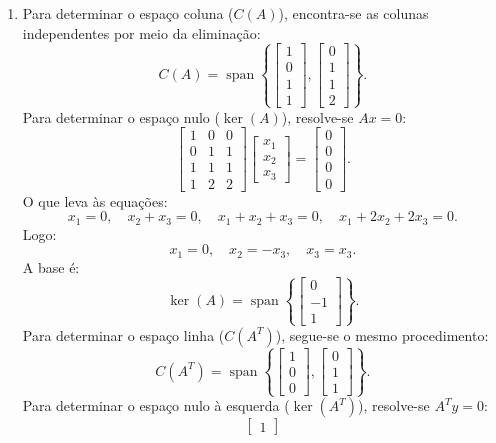 \begin{resolution}
\begin{enumerate}[label=\alph*)]
    \item Para determinar o espaço coluna (\( C(A) \)), encontra-se as colunas independentes por meio da eliminação:
          \[
            C(A) = \operatorname{span}\left\{
            \begin{bmatrix} 1 \\ 0 \\ 1 \\ 1 \end{bmatrix},
            \begin{bmatrix} 0 \\ 1 \\ 1 \\ 2 \end{bmatrix}
            \right\}.
          \]
          Para determinar o espaço nulo (\( \operatorname{ker}(A) \)), resolve-se \( A x = 0 \):
          \[
            \begin{bmatrix}
              1 & 0 & 0 \\
              0 & 1 & 1 \\
              1 & 1 & 1 \\
              1 & 2 & 2
            \end{bmatrix}
            \begin{bmatrix}
              x_1 \\ x_2 \\ x_3
            \end{bmatrix} =
            \begin{bmatrix}
              0 \\ 0 \\ 0 \\ 0
            \end{bmatrix}.
          \]
          O que leva às equações:
          \[
            x_1 = 0, \quad x_2 + x_3 = 0, \quad x_1 + x_2 + x_3 = 0, \quad x_1 + 2x_2 + 2x_3 = 0.
          \]
          Logo:
          \[
            x_1 = 0, \quad x_2 = -x_3, \quad x_3 = x_3.
          \]
          A base é:
          \[
            \operatorname{ker}(A) =  \operatorname{span}\left\{
            \begin{bmatrix} 0 \\ -1 \\ 1 \end{bmatrix}
            \right\}.
          \]
          Para determinar o espaço linha (\( C(A^T) \)), segue-se o mesmo procedimento:
          \[
            C(A^T) = \operatorname{span}\left\{
            \begin{bmatrix} 1 \\ 0 \\ 0 \end{bmatrix},
            \begin{bmatrix} 0 \\ 1 \\ 1 \end{bmatrix}
            \right\}.
          \]
          Para determinar o espaço nulo à esquerda (\( \operatorname{ker}(A^T) \)), resolve-se \( A^T y = 0 \):
          \[
            \begin{bmatrix}
              1


\end{bmatrix}\]
\end{enumerate}
\end{resolution}
